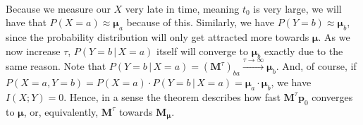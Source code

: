 \documentclass[../../main.tex]{subfiles}
\begin{document}
    ~\\
    Because we measure our $X$ very late in time, meaning $t_0$ is very large, we will have that $P(X = a) \approx \boldsymbol{\mu}_a$ because of this. Similarly, we have $P(Y = b) \approx \boldsymbol{\mu}_b$, since the probability distribution will only get attracted more towards $\boldsymbol{\mu}$. As we now increase $\tau$, $P(Y = b \,|\, X = a)$ itself will converge to $\boldsymbol{\mu}_b$ exactly due to the same reason. Note that $P(Y = b \,|\, X = a) = (\boldsymbol{M}^{\tau})_{ba} \xrightarrow{\tau \to \infty}  \boldsymbol{\mu}_b$. And, of course, if $P(X = a, Y = b) = P(X = a) \cdot P(Y = b \,|\, X = a) = \boldsymbol{\mu}_a \cdot \boldsymbol{\mu}_b$, we have $I(X; Y) = 0$. Hence, in a sense the theorem describes how fast $\boldsymbol{M}^{\tau}\bm{p}_0$ converges to $\boldsymbol{\mu}$, or, equivalently, $\boldsymbol{M}^{\tau}$ towards $\boldsymbol{M}_{\boldsymbol{\mu}}$.
\end{document}
